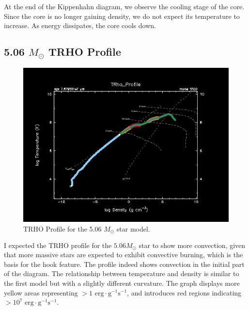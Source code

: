 \documentclass[fleqn,usenatbib]{mnras}
\begin{document}
\par At the end of the Kippenhahn diagram, we observe the cooling stage of the core. Since the core is no longer gaining density, we do not expect its temperature to increase. As energy dissipates, the core cools down.

\subsection{5.06 \(M_\odot\) TRHO Profile}

\begin{figure}

    \includegraphics[width=\columnwidth]{trho_profile_05520.png}
    \caption{TRHO Profile for the 5.06 \(M_\odot\) star model.}
    \label{fig:5.06_M_sun_trho_figure}
\end{figure}

\par I expected the TRHO profile for the \(5.06 M_\odot\) star to show more convection, given that more massive stars are expected to exhibit convective burning, which is the basis for the hook feature. The profile indeed shows convection in the initial part of the diagram. The relationship between temperature and density is similar to the first model but with a slightly different curvature. The graph displays more yellow areas representing \(> 1 \text{ erg} \cdot \text{g}^{-1} \text{s}^{-1}\), and introduces red regions indicating \(> 10^7 \text{ erg} \cdot \text{g}^{-1} \text{s}^{-1}\).
\end{document}
